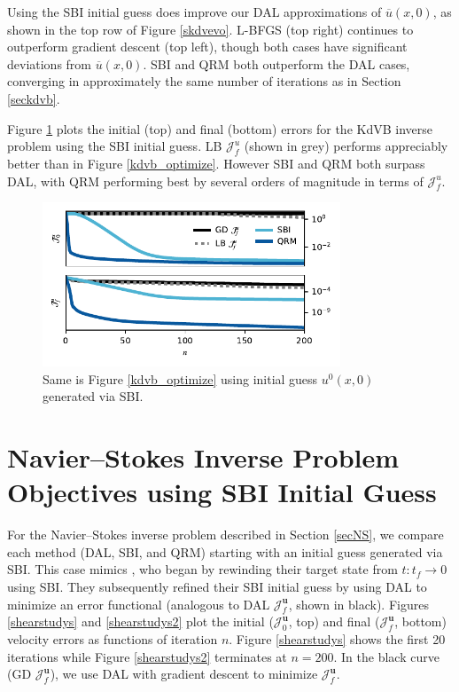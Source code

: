 \documentclass[%
 reprint,
 amsmath,amssymb,
 aps,
 pre,
]{revtex4-2}
\renewcommand{\vec}[1]{\boldsymbol{#1}}
\newcommand{\Juf}{\mathcal{J}^{u}_f}
\newcommand{\JUo}{\mathcal{J}^{\vec{u}}_0}
\newcommand{\JUf}{\mathcal{J}^{\vec{u}}_f}
\begin{document}
Using the SBI initial guess does improve our DAL approximations of $\overline{u}(x,0)$, as shown in the top row of Figure \ref{skdvevo}.
L-BFGS (top right) continues to outperform gradient descent (top left), though both cases have significant deviations from $\overline{u}(x,0)$.
SBI and QRM both outperform the DAL cases, converging in approximately the same number of iterations as in Section \ref{seckdvb}.

Figure \ref{skdvb_optimize} plots the initial (top) and final (bottom) errors for the KdVB inverse problem using the SBI initial guess.
LB $\Juf$ (shown in grey) performs appreciably better than in Figure \ref{kdvb_optimize}.
However SBI and QRM both surpass DAL, with QRM performing best by several orders of magnitude in terms of $\Juf$.

\begin{figure}
  \centering
  \includegraphics[width=3.5in]{sapprox/PLTC/all.pdf}
  \caption{Same is Figure \ref{kdvb_optimize} using initial guess $u^0(x, 0)$ generated via SBI.}
  \label{skdvb_optimize}
\end{figure}

\section{Navier--Stokes Inverse Problem Objectives using SBI Initial Guess}\label{secAppNSBI}

For the Navier--Stokes inverse problem described in Section \ref{secNS}, we compare each method (DAL, SBI, and QRM) starting with an initial guess generated via SBI. 
This case mimics \cite{Li2017,Liu2008}, who began by rewinding their target state from $t:t_f\to 0$ using SBI. 
They subsequently refined their SBI initial guess by using DAL to minimize an error functional (analogous to DAL $\JUf$, shown in black). 
Figures \ref{shearstudys} and \ref{shearstudys2} plot the initial ($\JUo$, top) and final ($\JUf$, bottom) velocity errors as functions of iteration $n$.
Figure \ref{shearstudys} shows the first 20 iterations while Figure \ref{shearstudys2} terminates at $n=200$.
In the black curve (GD $\JUf$), we use DAL with gradient descent to minimize $\JUf$. 
\end{document}
